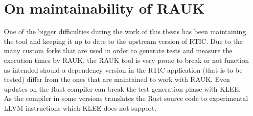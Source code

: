 \section{On maintainability of RAUK}
One of the bigger difficulties during the work of this thesis has been
maintaining the tool and keeping it up to date to the upstream version of RTIC.
Due to the many custom forks that are used in order to generate tests and
measure the execution times by RAUK, the RAUK tool is very prone to break or
not function as intended should a dependency version in the RTIC application
(that is to be tested) differ from the ones that are maintained to work with
RAUK. Even updates on the Rust compiler can break the test generation phase
with KLEE. As the compiler in some versions translates the Rust source code to
experimental LLVM instructions which KLEE does not support.
